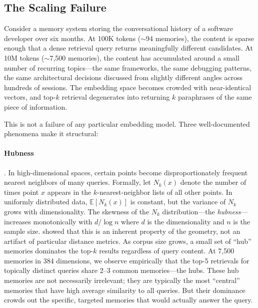 \documentclass[11pt]{article}
\begin{document}
\subsection{The Scaling Failure}
\label{sec:scaling-failure}

Consider a memory system storing the conversational history of a
software developer over six months.  At 100K tokens ($\sim$94 memories),
the content is sparse enough that a dense retrieval query returns
meaningfully different candidates.  At 10M tokens ($\sim$7,500 memories),
the content has accumulated around a small number of recurring
topics---the same frameworks, the same debugging patterns, the same
architectural decisions discussed from slightly different angles
across hundreds of sessions.  The embedding space becomes crowded
with near-identical vectors, and top-$k$ retrieval degenerates into
returning $k$ paraphrases of the same piece of information.

This is not a failure of any particular embedding model.  Three
well-documented phenomena make it structural:

\paragraph{Hubness} \citep{Radovanovic2010}.
In high-dimensional spaces, certain points become disproportionately
frequent nearest neighbors of many queries.  Formally, let $N_k(x)$
denote the number of times point $x$ appears in the $k$-nearest-neighbor
lists of all other points.  In uniformly distributed data,
$\mathbb{E}[N_k(x)]$ is constant, but the variance of $N_k$ grows
with dimensionality.  The skewness of the $N_k$ distribution---the
\emph{hubness}---increases monotonically with $d / \log n$ where $d$
is the dimensionality and $n$ is the sample size.
\citet{Radovanovic2010} showed that this is an inherent property of
the geometry, not an artifact of particular distance metrics.  As
corpus size grows, a small set of ``hub'' memories dominates the
top-$k$ results regardless of query content.  At 7,500 memories in
384 dimensions, we observe empirically that the top-5 retrievals for
topically distinct queries share 2--3 common memories---the hubs.
These hub memories are not necessarily irrelevant; they are typically
the most ``central'' memories that have high average similarity to
all queries.  But their dominance crowds out the specific, targeted
memories that would actually answer the query.
\end{document}
